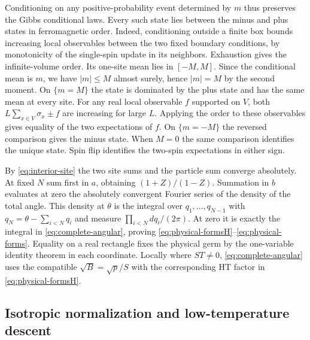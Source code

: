 \documentclass[11pt]{article}
\numberwithin{equation}{section}
\theoremstyle{definition}
\begin{document}
Conditioning on any positive-probability event determined by $m$
thus preserves the Gibbs conditional laws. Every such state lies
between the minus and plus states in ferromagnetic order. Indeed,
conditioning outside a finite box bounds increasing local observables
between the two fixed boundary conditions, by monotonicity of the
single-spin update in its neighbors. Exhaustion gives the infinite-volume order.
Its one-site mean lies in $[-M,M]$. Since the conditional mean is
$m$, we have $|m|\le M$ almost surely, hence $|m|=M$ by the second
moment. On $\{m=M\}$ the state is dominated by the plus state and
has the same mean at every site. For any real local observable $f$
supported on $V$, both $L\sum_{x\in V}\sigma_x\pm f$ are increasing
for large $L$. Applying the order to these observables gives equality
of the two expectations of $f$. On $\{m=-M\}$ the reversed comparison
gives the minus state. When $M=0$ the same comparison identifies the
unique state. Spin flip identifies the two-spin expectations in
either sign.

By \eqref{eq:interior-site} the two site sums and the particle sum
converge absolutely. At fixed $N$ sum first in $a$, obtaining
$(1+Z)/(1-Z)$. Summation in $b$ evaluates at zero the absolutely
convergent Fourier series of the density of the total angle. This
density at $\theta$ is the integral over $q_1,\ldots,q_{N-1}$ with
$q_N=\theta-\sum_{i<N}q_i$ and measure
$\prod_{i<N}dq_i/(2\pi)$. At zero it is exactly the integral in
\eqref{eq:complete-angular}, proving \eqref{eq:physical-formsH}--\eqref{eq:physical-forms}.
Equality on a real rectangle fixes the physical germ by the one-variable identity
theorem in each coordinate. Locally where $ST\ne0$, \eqref{eq:complete-angular} uses the
compatible $\sqrt B=\sqrt p/S$ with the corresponding HT factor
in \eqref{eq:physical-formsH}.

\subsection{Isotropic normalization and low-temperature descent}
\end{document}
